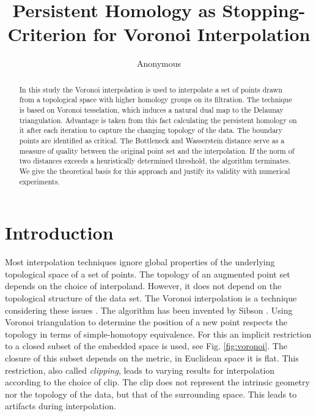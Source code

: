 \documentclass[runningheads]{llncs}
\begin{document}
%
\title{Persistent Homology as Stopping-Criterion for Voronoi Interpolation}
%
%
\author{Anonymous}
%
%
%
\maketitle              %
%
\begin{abstract}
In this study the Voronoi interpolation is used to interpolate a set of points  drawn from a topological space with higher homology groups on its filtration. The technique is based on Voronoi tesselation, which induces a natural dual map to the Delaunay triangulation. Advantage is taken from this fact calculating the persistent homology on it after each iteration to capture the changing topology of the data. The boundary points are identified as critical. The Bottleneck and Wasserstein distance serve as a measure of quality between the original point set and the interpolation. If the norm of two distances exceeds a heuristically determined threshold, the algorithm terminates. We give the theoretical basis for this approach and justify its validity with numerical experiments.

\end{abstract}


\section{Introduction}
\label{introduction}
Most interpolation techniques ignore global properties of the underlying topological space of a set of points. The topology of an augmented point set depends on the choice of interpoland. However, it does not depend on the topological structure of the data set. The Voronoi interpolation is a technique considering these issues \cite{Bobach2009}. The algorithm has been invented by Sibson \cite{Sibson}. Using Voronoi triangulation to determine the position of a new point respects the topology in terms of simple-homotopy equivalence. For this an implicit restriction to a closed subset of the embedded space is used, see Fig. \ref{fig:voronoi}. The closure of this subset depends on the metric, in Euclidean space it is flat. This restriction, also called \textit{clipping}, leads to varying results for interpolation according to the choice of clip. The clip does not represent the intrinsic geometry nor the topology of the data, but that of the surrounding space. This leads to artifacts during interpolation.
\end{document}
